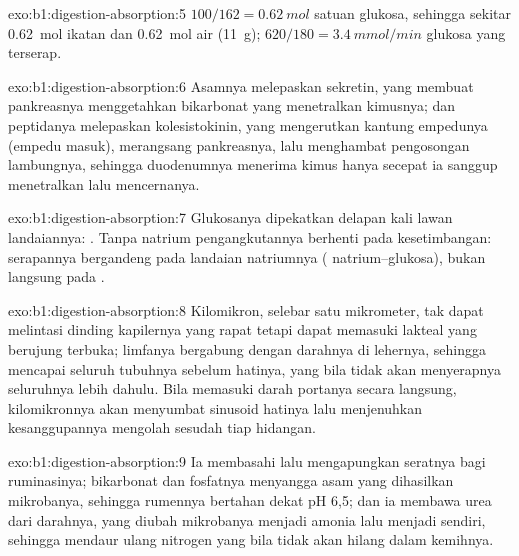 \begin{solution}{exo:b1:digestion-absorption:5}
$100/162 = \qty{0.62}{mol}$ satuan glukosa, sehingga sekitar
\qty{0.62}{mol} ikatan dan \qty{0.62}{mol} air (\qty{11}{g});
$620/180 = \qty{3.4}{mmol/min}$ glukosa yang terserap.
\end{solution}

\begin{solution}{exo:b1:digestion-absorption:6}
Asamnya melepaskan sekretin, yang membuat pankreasnya menggetahkan
bikarbonat yang menetralkan kimusnya;  dan peptidanya melepaskan
kolesistokinin, yang mengerutkan kantung empedunya (empedu masuk),
merangsang  pankreasnya, lalu menghambat pengosongan lambungnya,
sehingga duodenumnya menerima kimus hanya secepat ia sanggup
menetralkan lalu mencernanya.
\end{solution}

\begin{solution}{exo:b1:digestion-absorption:7}
Glukosanya dipekatkan delapan kali lawan landaiannya: . Tanpa natrium pengangkutannya berhenti pada kesetimbangan:
serapannya bergandeng pada landaian natriumnya (
natrium--glukosa), bukan langsung pada .
\end{solution}

\begin{solution}{exo:b1:digestion-absorption:8}
Kilomikron, selebar satu mikrometer, tak dapat melintasi dinding
kapilernya yang rapat tetapi dapat memasuki lakteal yang berujung
terbuka; limfanya bergabung dengan darahnya di lehernya, sehingga
 mencapai seluruh tubuhnya sebelum hatinya, yang bila tidak
akan menyerapnya seluruhnya lebih dahulu. Bila memasuki darah portanya
secara langsung, kilomikronnya akan menyumbat sinusoid hatinya lalu
menjenuhkan kesanggupannya mengolah  sesudah tiap hidangan.
\end{solution}

\begin{solution}{exo:b1:digestion-absorption:9}
Ia membasahi lalu mengapungkan seratnya bagi ruminasinya; bikarbonat
dan fosfatnya menyangga asam yang dihasilkan mikrobanya, sehingga
rumennya bertahan dekat pH 6,5; dan ia membawa urea dari darahnya,
yang diubah mikrobanya menjadi amonia lalu menjadi  sendiri,
sehingga mendaur ulang nitrogen yang bila tidak akan hilang dalam
kemihnya.
\end{solution}

